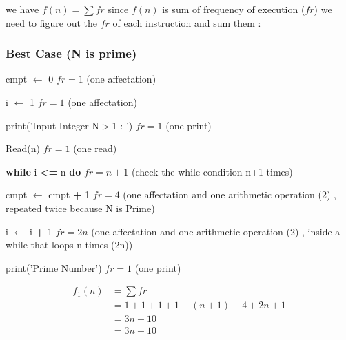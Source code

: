 we have \(f(n) = \sum fr\) since \(f(n)\) is sum of frequency of execution (\(fr\)) we need to figure out the
\(fr\) of each instruction and sum them : 

\subsubsection*{\underline{Best Case (N is prime)}}

\vspace{0.5cm}
cmpt $\gets$ 0  \hspace{4cm} \(fr = 1\) (one affectation)

\vspace{0.15cm}
i $\gets$ 1  \hspace{4.65cm} \(fr = 1\) (one affectation)

\vspace{0.15cm}
\textcolor{purplePlot!80!black}{print}(\textcolor{blueArea!60!black}{'Input Integer N\(>\)1 : '})  \hspace{0.95cm} \(fr = 1\) (one print)

\vspace{0.15cm}
\textcolor{purplePlot!80!black}{Read}(n)  \hspace{4.25cm} \(fr = 1\) (one read)

\vspace{0.15cm}

\textbf{while} i \textcolor{redPlot}{\textbf{\textless=}} n  \textbf{do} \hspace{2.75cm} \(fr = n+1\) (check the while condition n+1 times)


\vspace{0.15cm}
cmpt $\gets$ cmpt \textcolor{redPlot}{ \textbf{+}} 1 \hspace{2.6cm} \(fr = 4\) (one affectation and one arithmetic operation (2) , repeated twice because N is Prime)

\vspace{0.15cm}
i $\gets$ i \textcolor{redPlot}{ \textbf{+}} 1 \hspace{4cm} \(fr = 2n\) (one affectation and one arithmetic operation (2) ,  inside a while that loops n times (2n))

\vspace{0.15cm}

\textcolor{purplePlot!80!black}{print}(\textcolor{blueArea!60!black}{'Prime Number'}) \hspace{1.95cm} \(fr = 1\) (one print)

\vspace{0.75cm}
\begin{align*}
f_1(n) &= \sum fr \\
     &= 1 + 1 + 1 + 1 + (n+1) + 4 + 2n + 1 \\
     &= 3n + 10 \\
     &= \boxed{3n + 10}
\end{align*}

